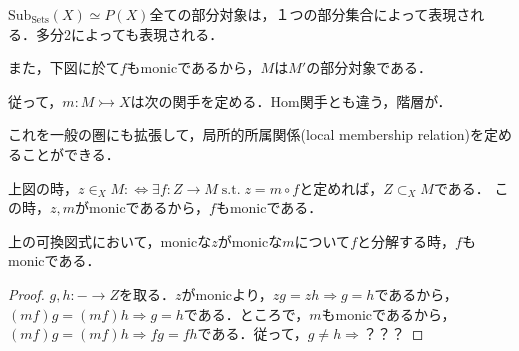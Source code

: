 \documentclass[uplatex, dvipdfmx]{jsarticle}
\begin{document}
\begin{example*}
    $\mathrm{Sub}_{\mathrm{Sets}}(X)\simeq P(X)$全ての部分対象は，１つの部分集合によって表現される．多分2によっても表現される．

    また，下図に於て$f$もmonicであるから，$M$は$M'$の部分対象である．
    \begin{center}
    \end{center}
    従って，$m:M\rightarrowtail X$は次の関手を定める．Hom関手とも違う，階層が．
    \begin{center}
    \end{center}

    これを一般の圏にも拡張して，局所的所属関係(local membership relation)を定めることができる．
    \begin{center}
    \end{center}
    上図の時，$z\in_XM:\Leftrightarrow \exists f:Z\to M\;\mathrm{s.t.}\; z=m\circ f$と定めれば，$Z\subset_X M$である．
    この時，$z,m$がmonicであるから，$f$もmonicである．
    \begin{proposition*}[???]
        上の可換図式において，monicな$z$がmonicな$m$について$f$と分解する時，$f$もmonicである．
    \end{proposition*}
    \begin{proof}
        $g,h:-\to Z$を取る．$z$がmonicより，$zg=zh\Rightarrow g=h$であるから，$(mf)g=(mf)h\Rightarrow g=h$である．ところで，$m$もmonicであるから，$(mf)g=(mf)h\Rightarrow fg=fh$である．従って，$g\ne h\Rightarrow $？？？
    \end{proof}
\end{example*}
\end{document}
